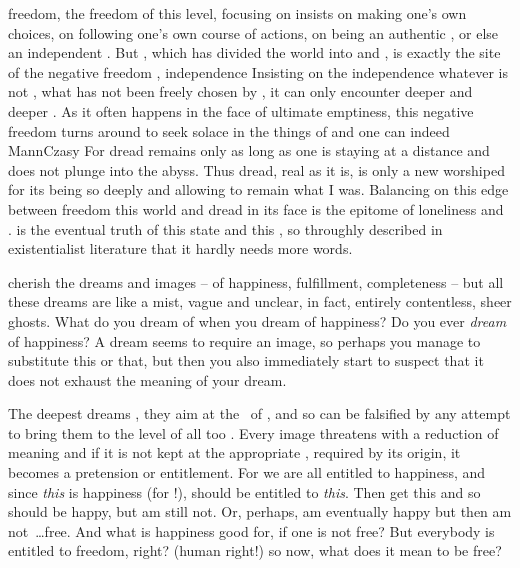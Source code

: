  freedom, the  freedom of this level, focusing on
 insists on making one's own choices, on following one's
  own course of actions, on being an authentic , or else an
independent .  But , which has divided the world
into  and , is exactly the site of the negative freedom
, independence   Insisting on the independence  whatever is not
, what has not been freely chosen by , it can only encounter
deeper and deeper . 
As it often happens in the face of ultimate emptiness, this
negative freedom turns around to seek solace in the things of  and one can indeed
\citet{ask the question if man, following the need of psychological and
metaphysical bonds, does not prefer dread over freedom.}{MannCzasy}{} For
dread remains only as long as one is staying at a distance and does not plunge
into the abyss. Thus dread, real as it is, is only a new 
worshiped for its being so deeply  and allowing  to remain what
I was. Balancing on this edge between freedom  this world and dread in
its face is the epitome of loneliness and .  is the eventual truth of this state and this
, so throughly described 
in existentialist literature that it hardly needs more words.


\pa %
 cherish the dreams and images -- of happiness, fulfillment, completeness
-- but all these dreams are like a mist, vague and unclear, in fact, entirely
contentless, sheer ghosts. What do you dream of when you dream of happiness? Do
you ever {\em dream} of happiness? A dream seems to require an image, so perhaps you
manage to substitute this or that, but then you also immediately start to
suspect that it does not exhaust the meaning of your dream.

The deepest dreams  , they aim at the \nexus\ of \Yes,
and so can be falsified by any attempt to bring them to the level of all too
. Every image threatens with a reduction of meaning and if it is not
kept at the appropriate , required by its origin, it becomes a
pretension or entitlement. For we are all entitled to happiness, and since {\em
  this} is happiness (for !),  should be entitled to {\em this}.
Then  get this and so  should be happy, but  am still not. Or,
perhaps,  am eventually happy but then  am not~\ldots free. And what is
happiness good for, if one is not free? But everybody is entitled to freedom,
right? (human right!) so now, what does it mean to be free?

